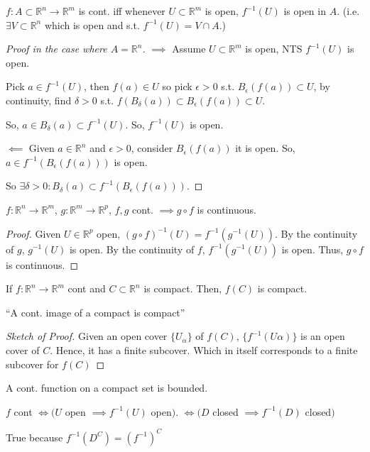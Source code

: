 \documentclass[a4paper]{article}
\numberwithin{equation}{section}
\newcommand{\R}{\mathbb{R}}
\begin{document}
\begin{theorem}

    $f:A\subset\R^n\to\R^m$ is cont. iff whenever $U\subset\R^m$ is open, $f^{-1}(U)$ is open in $A$. (i.e. $\exists V\subset\R^n$ which is open and s.t. $f^{-1}(U)=V\cap A$.)

    \begin{proof}[Proof in the case where $A=\R^n$] 
        $\implies$ Assume $U\subset\R^m$ is open, NTS $f^{-1}(U)$ is open.
        \vspace{10pt}

        Pick $a\in f^{-1}(U)$, then $f(a)\in U$ so pick $\epsilon>0$ s.t. $B_{\epsilon}(f(a))\subset U$, by continuity, find $\delta>0$ s.t. $f(B_{\delta}(a))\subset B_{\epsilon}(f(a))\subset U$.
        \vspace{10pt}

        So, $a\in B_{\delta}(a)\subset f^{-1}(U)$. So, $f^{-1}(U)$ is open.
        \vspace{10pt}

        $\impliedby$ Given $a\in\R^n$ and $\epsilon>0$, consider $B_\epsilon(f(a))$ it is open. So, $a\in f^{-1}(B_\epsilon(f(a)))$ is open.
        \vspace{10pt}

        So $\exists\delta>0:B_\delta(a)\subset f^{-1}(B_{\epsilon}(f(a)))$.        
    \end{proof}
\end{theorem}

\begin{theorem}
    $f:\R^n\to\R^m$, $g:\R^m\to\R^p$, $f,g$ cont. $\implies g\circ f$ is continuous. 
    \begin{proof}
        Given $U\in\R^p$ open, $(g\circ f)^{-1}(U)=f^{-1}(g^{-1}(U))$. By the continuity of $g$, $g^{-1}(U)$ is open. By the continuity of $f$, $f^{-1}(g^{-1}(U))$ is open. Thus, $g\circ f$ is continuous. 
    \end{proof}
\end{theorem}

\begin{theorem}
    If $f:\R^n\to\R^m$ cont and $C\subset\R^n$ is compact. Then, $f(C)$ is compact. 
    
    ``A cont. image of a compact is compact''
    \begin{proof}[Sketch of Proof]
        Given an open cover $\{U_\alpha\}$ of $f(C)$, $\{f^{-1}(U\alpha)\}$ is an open cover of $C$. Hence, it has a finite subcover. Which in itself corresponds to a finite subcover for $f(C)$
    \end{proof}
\end{theorem}
\begin{corollary}
    A cont. function on a compact set is bounded. 
\end{corollary}
\begin{theorem}
    $f$ cont $\iff (U$ open $\implies f^{-1}(U)$ open$)$. $\iff (D$ closed $\implies f^{-1}(D)$ closed$)$

    True because $f^{-1}(D^C)=(f^{-1})^C$
\end{theorem}
\end{document}
